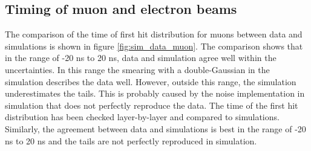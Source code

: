 \documentclass{JINST}
\begin{document}
\begin{table}[htb!]
  \centering
  \caption{Summary of systematic uncertainties.}
  \label{table:time_syst}
\end{table}

\subsection{Timing of muon and electron beams}

The comparison of the time of first hit distribution for muons between data and simulations is shown in figure \ref{fig:sim_data_muon}. The comparison shows that in the range of -20 ns to 20 ns, data and simulation agree well within the uncertainties. In this range the smearing with a double-Gaussian in the simulation describes the data well. However, outside this range, the simulation underestimates the tails. This is probably caused by the noise implementation in simulation that does not perfectly reproduce the data. The time of the first hit distribution has been checked layer-by-layer and compared to simulations. Similarly, the agreement between data and simulations is best in the range of -20 ns to 20 ns and the tails are not perfectly reproduced in simulation.
\end{document}
